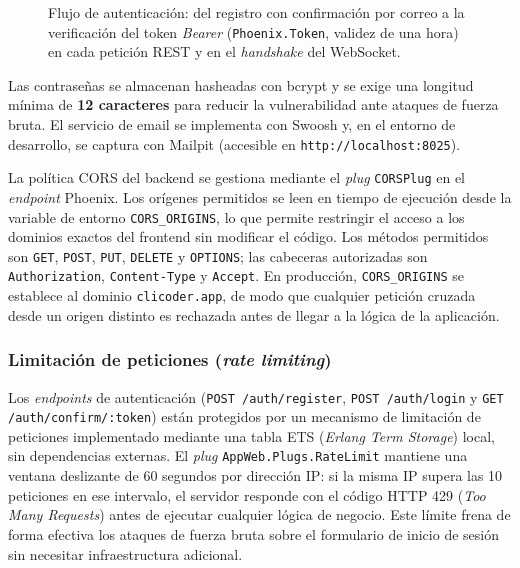 \begin{figure}[ht]
\centering
\resizebox{0.9\textwidth}{!}{}
\caption{Flujo de autenticación: del registro con confirmación por correo a la verificación del token \emph{Bearer} (\texttt{Phoenix.Token}, validez de una hora) en cada petición REST y en el \emph{handshake} del WebSocket.}
\label{fig:auth-flujo}
\end{figure}

Las contraseñas se almacenan hasheadas con bcrypt y se exige una longitud mínima de \textbf{12 caracteres} para reducir la vulnerabilidad ante ataques de fuerza bruta. El servicio de email se implementa con Swoosh y, en el entorno de desarrollo, se captura con Mailpit (accesible en \texttt{http://localhost:8025}).

La política CORS del backend se gestiona mediante el \emph{plug} \texttt{CORSPlug} en el \emph{endpoint} Phoenix. Los orígenes permitidos se leen en tiempo de ejecución desde la variable de entorno \texttt{CORS\_ORIGINS}, lo que permite restringir el acceso a los dominios exactos del frontend sin modificar el código. Los métodos permitidos son \texttt{GET}, \texttt{POST}, \texttt{PUT}, \texttt{DELETE} y \texttt{OPTIONS}; las cabeceras autorizadas son \texttt{Authorization}, \texttt{Content-Type} y \texttt{Accept}. En producción, \texttt{CORS\_ORIGINS} se establece al dominio \texttt{clicoder.app}, de modo que cualquier petición cruzada desde un origen distinto es rechazada antes de llegar a la lógica de la aplicación.

\subsubsection{Limitación de peticiones (\emph{rate limiting})}

Los \emph{endpoints} de autenticación (\texttt{POST /auth/register}, \texttt{POST /auth/login} y \texttt{GET /auth/confirm/:token}) están protegidos por un mecanismo de limitación de peticiones implementado mediante una tabla ETS (\emph{Erlang Term Storage}) local, sin dependencias externas. El \emph{plug} \texttt{AppWeb.Plugs.RateLimit} mantiene una ventana deslizante de 60 segundos por dirección IP: si la misma IP supera las 10 peticiones en ese intervalo, el servidor responde con el código HTTP 429 (\emph{Too Many Requests}) antes de ejecutar cualquier lógica de negocio. Este límite frena de forma efectiva los ataques de fuerza bruta sobre el formulario de inicio de sesión sin necesitar infraestructura adicional.

